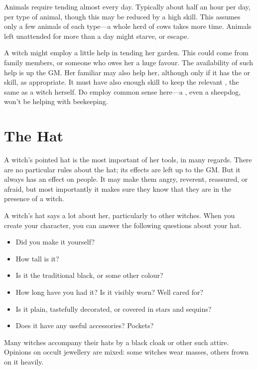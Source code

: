 Animals require tending almost every day.
Typically about half an hour per day, per type of animal, though this may be reduced by a high  skill.
This assumes only a few animals of each type---a whole herd of cows takes more time.
Animals left unattended for more than a day might starve, or escape.

A witch might employ a little help in tending her garden.
This could come from family members, or someone who owes her a huge favour.
The availability of such help is up the GM.
Her familiar may also help her, although only if it has the  or  skill, as appropriate.
It must have also enough  skill to keep the relevant , the same as a witch herself.
Do employ common sense here---a , even a sheepdog, won't be helping with beekeeping.



\section{The Hat}

A witch's pointed hat is the most important of her tools, in many regards.
There are no particular rules about the hat; its effects are left up to the GM.
But it always has an effect on people.
It may make them angry, reverent, reassured, or afraid, but most importantly it makes sure they know that they are in the presence of a witch.

A witch's hat says a lot about her, particularly to other witches.
When you create your character, you can answer the following questions about your hat.

\begin{itemize}
	\item Did you make it yourself?
	\item How tall is it?
	\item Is it the traditional black, or some other colour?
	\item How long have you had it?
		Is it visibly worn?
		Well cared for?
	\item Is it plain, tastefully decorated, or covered in stars and sequins?
	\item Does it have any useful accessories?
		Pockets?
\end{itemize}

Many witches accompany their hats by a black cloak or other such attire.
Opinions on occult jewellery are mixed: some witches wear masses, others frown on it heavily.
